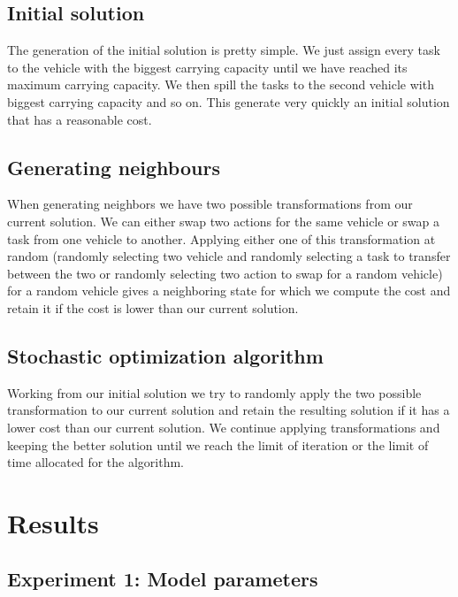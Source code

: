 \documentclass[11pt]{article}
\begin{document}
\subsection{Initial solution}
The generation of the initial solution is pretty simple. We just
assign every task to the vehicle with the biggest carrying
capacity until we have reached its maximum carrying capacity. We then
spill the tasks to the second vehicle with biggest carrying capacity
and so on. This generate very quickly an initial solution that has a
reasonable cost.

\subsection{Generating neighbours}

When generating neighbors we have two possible transformations from
our current solution. We can either swap two actions for the same
vehicle or swap a task from one vehicle to another. Applying either
one of this transformation at random (randomly selecting two vehicle
and randomly selecting a task to transfer between the two or randomly
selecting two action to swap for a random vehicle) for a random
vehicle gives a neighboring state for which we compute the cost and
retain it if the cost is lower than our current solution.


\subsection{Stochastic optimization algorithm}
Working from our initial solution we try to randomly apply the two
possible transformation to our current solution and retain the
resulting solution if it has a lower cost than our current
solution. We continue applying transformations and keeping the better
solution until we reach the limit of iteration or the limit of time
allocated for the algorithm.

\section{Results}

\subsection{Experiment 1: Model parameters}
\end{document}
